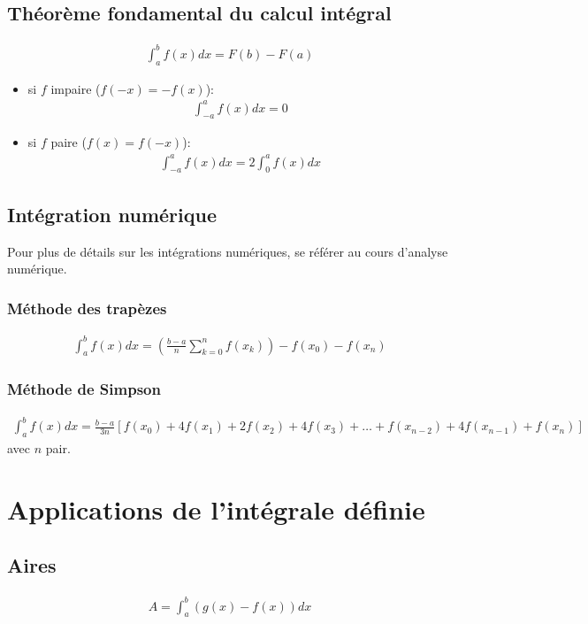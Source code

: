 \section{Théorème fondamental du calcul intégral}
\begin{eqnarray}
	\int_a^bf(x)dx=F(b)-F(a)
\end{eqnarray}
\begin{itemize}
	\item si $f$ impaire ($f(-x)=-f(x)$):
	\begin{eqnarray}
		\int_{-a}^a f(x)dx=0
	\end{eqnarray}
	\item si $f$ paire ($f(x)=f(-x)$):
	\begin{eqnarray}
	\int_{-a}^af(x)dx=2\int_0^af(x)dx
	\end{eqnarray}
\end{itemize}
	
\section{Intégration numérique}

Pour plus de détails sur les intégrations numériques, se référer au cours d'analyse numérique.
\subsection{Méthode des trapèzes}
\begin{eqnarray}
	\int_a^bf(x)dx=\left(\frac{b-a}{n}\sum_{k=0}^nf(x_k)\right)-f(x_0)-f(x_n)
\end{eqnarray}
\subsection{Méthode de Simpson}
\begin{eqnarray}
	\int_a^bf(x)dx
	=\frac{b-a}{3n}\left[f(x_0)+4f(x_1)+2f(x_2)+4f(x_3)+\dots+f(x_{n-2})+4f(x_{n-1})+f(x_n)\right]
\end{eqnarray}
avec $n$ pair.

\chapter{Applications de l'intégrale définie}

\section{Aires}
\begin{eqnarray}
	A=\int_a^b\left(g(x)-f(x)\right)dx
\end{eqnarray}

